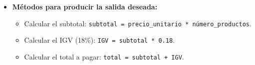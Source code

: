 \documentclass{article}
\begin{document}
\begin{enumerate}
\begin{itemize}
                \item \textbf{Métodos para producir la salida deseada:}
                
                \begin{itemize}
                    \item Calcular el subtotal: \texttt{subtotal = precio\_unitario * número\_productos}.
                    \item Calcular el IGV (18\%): \texttt{IGV = subtotal * 0.18}.
                    \item Calcular el total a pagar: \texttt{total = subtotal + IGV}.
                \end{itemize}
            \end{itemize}
    \end{enumerate}

\end{document}
